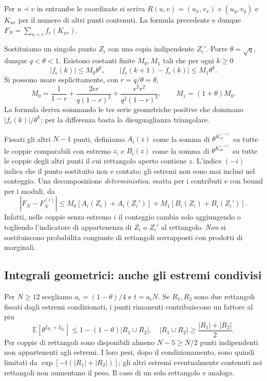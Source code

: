 \documentclass[11pt,a4paper]{article}
\begin{document}
Per $u\prec v$ in entrambe le coordinate si scriva $R(u,v)=(u_x,v_x)\times(u_y,v_y)$ e $K_{uv}$ per il numero di altri punti contenuti. La formula precedente e dunque $F_N=\sum_{u\prec v}f_\epsilon(K_{uv})$.

Sostituiamo un singolo punto $Z_i$ con una copia indipendente $Z_i'$. Porre $\theta=\sqrt q$, dunque $q<\theta<1$. Esistono costanti finite $M_0,M_1$ tali che per ogni $k\ge0$
\begin{equation}
 |f_\epsilon(k)|\le M_0\theta^k,\qquad
 |f_\epsilon(k+1)-f_\epsilon(k)|\le M_1\theta^k.
 \label{eq:r12ac_weights}
\end{equation}
Si possono usare esplicitamente, con $r=q/\theta=\theta$,
\begin{equation}
 M_0=\frac1{1-r}+\frac{2\epsilon r}{q(1-r)^2}
 +\frac{\epsilon^2 r^2}{q^2(1-r)^3},
 \qquad M_1=(1+\theta)M_0.
 \label{eq:r12ac_constants}
\end{equation}
La formula deriva sommando le tre serie geometriche positive che dominano $|f_\epsilon(k)|/\theta^k$; per la differenza basta la disuguaglianza triangolare.

Fissati gli altri $N-1$ punti, definiamo $A_i(z)$ come la somma di $\theta^{K^{(-i)}_{zv}}$ su tutte le coppie comparabili con estremo $z$, e $B_i(z)$ come la somma di $\theta^{K^{(-i)}_{uv}}$ su tutte le coppie degli altri punti il cui rettangolo aperto contiene $z$. L'indice $(-i)$ indica che il punto sostituito non e contato; gli estremi non sono mai inclusi nel conteggio. Una decomposizione \emph{deterministica}, esatta per i contributi e con bound per i moduli, da
\begin{equation}
 |F_N-F_N^{(i)}|\le
 M_0[A_i(Z_i)+A_i(Z_i')]+M_1[B_i(Z_i)+B_i(Z_i')].
 \label{eq:r12ac_influence}
\end{equation}
Infatti, nelle coppie senza estremo $i$ il conteggio cambia solo aggiungendo o togliendo l'indicatore di appartenenza di $Z_i$ o $Z_i'$ al rettangolo. \emph{Non} si sostituiscono probabilita congiunte di rettangoli sovrapposti con prodotti di marginali.

\subsection{Integrali geometrici: anche gli estremi condivisi}

Per $N\ge12$ scegliamo $a_\epsilon=(1-\theta)/4$ e $t=a_\epsilon N$. Se $R_1,R_2$ sono due rettangoli fissati dagli estremi condizionati, i punti rimanenti contribuiscono un fattore al piu
\begin{equation}
 \mathbb E\left[\theta^{I_{R_1}+I_{R_2}}\right]
 \le 1-(1-\theta)|R_1\cup R_2|,
 \quad |R_1\cup R_2|\ge\frac{|R_1|+|R_2|}{2}.
 \label{eq:r12ac_union}
\end{equation}
Per coppie di rettangoli sono disponibili almeno $N-5\ge N/2$ punti indipendenti non appartenenti agli estremi. I loro pesi, dopo il condizionamento, sono quindi limitati da $\exp[-t(|R_1|+|R_2|)]$; gli altri estremi eventualmente contenuti nei rettangoli non aumentano il peso. Il caso di un solo rettangolo e analogo.
\end{document}
